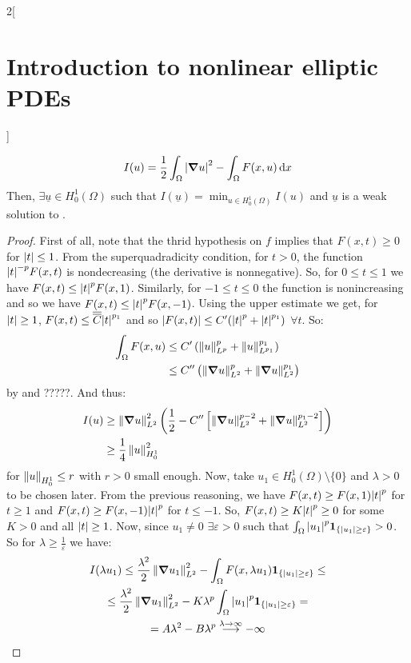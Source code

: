 \documentclass[../../../main_math.tex]{subfiles}
\begin{document}
\begin{multicols}{2}[\section{Introduction to nonlinear elliptic PDEs}]
\begin{proposition}
    $$
      I(u)=\frac{1}{2}\int_\Omega \abs{\grad u}^2-\int_\Omega F(x,u)\dd{x}
    $$
    Then, $\exists \underline{u}\in H_0^1(\Omega)$ such that $I(\underline{u})=\displaystyle \min_{u\in H_0^1(\Omega)}I(u)$ and $\underline{u}$ is a weak solution to .
  \end{proposition}
  \begin{proof}
    First of all, note that the thrid hypothesis on $f$ implies that $F(x,t)\geq 0$ for $\abs{t}\leq 1$. From the superquadradicity condition, for $t>0$, the function $\abs{t}^{-p}F(x,t)$ is nondecreasing (the derivative is nonnegative). So, for $0\leq t\leq 1$ we have $F(x,t)\leq \abs{t}^p F(x,1)$. Similarly, for $-1\leq t\leq 0$ the function is nonincreasing and so we have $F(x,t)\leq \abs{t}^p F(x,-1)$. Using the upper estimate we get, for $\abs{t}\geq 1$, ${F(x,t)}\leq \overline{\overline{C}} \abs{t}^{p_1}$ and so
    $\abs{F(x,t)}\leq C'(\abs{t}^p+\abs{t}^{p_1})$ $\forall t$. So:
    \begin{align*}
      \int_\Omega {F(x,u)} & \leq C'\left(\left\|u\right\|_{L^{p}}^p+\left\|u\right\|_{L^{p_1}}^{p_1}\right)        \\
                           & \leq C''\left(\left\|\grad u\right\|_{L^2}^p+\left\|\grad u\right\|_{L^2}^{p_1}\right)
    \end{align*}
    by  and ?????. And thus:
    \begin{align}
      I(u) & \geq \left\|\grad u\right\|_{L^2}^2\left(\frac{1}{2}-C''\left[\left\|\grad u\right\|_{L^2}^{p-2}+\left\|\grad u\right\|_{L^2}^{p_1-2}\right]\right)\nonumber \\
           & \label{INEPDE:I_mountain}\geq \frac{1}{4}\left\|u\right\|_{H_0^1}^2
    \end{align}
    for $\left\|u\right\|_{H_0^1}\leq r$ with $r>0$ small enough. Now, take $u_1\in H_0^1(\Omega)\setminus\{0\}$ and $\lambda>0$ to be chosen later. From the previous reasoning, we have $F(x,t)\geq F(x,1)\abs{t}^{p}$ for $t\geq 1$ and $F(x,t)\geq F(x,-1)\abs{t}^{p}$ for $t\leq -1$. So, $F(x,t)\geq K\abs{t}^{p}\geq0$ for some $K>0$ and all $\abs{t} \geq 1$. Now, since $u_1\ne 0$ $\exists \varepsilon>0$ such that $\int_\Omega \abs{u_1}^p\boldsymbol{\mathrm{1}}_{\{\abs{u_1}\geq \varepsilon\}}>0$. So for $\lambda\geq \frac{1}{\varepsilon}$ we have:
    \begin{multline*}
      I(\lambda u_1) \leq \frac{\lambda^2}{2}\norm{\grad u_1}_{L^2}^2-\int_\Omega F(x,\lambda u_1)\indi{\{\abs{u_1}\geq \varepsilon\}}\leq\\\leq \frac{\lambda^2}{2}\norm{\grad u_1}_{L^2}^2-K\lambda^p\int_\Omega \abs{u_1}^p\indi{\{\abs{u_1}\geq \varepsilon\}}=\\=A\lambda^2-B\lambda^p\overset{\lambda\to\infty}{\longrightarrow} -\infty

\end{multline*}
\end{proof}
\end{multicols}
\end{document}
